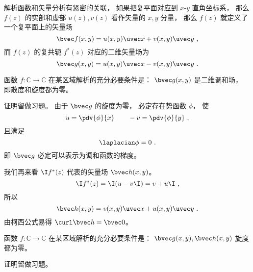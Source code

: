 

解析函数和矢量分析有紧密的关联， 如果把复平面对应到 $x$-$y$ 直角坐标系， 那么 $f(z)$ 的实部和虚部 $u(z), v(z)$ 看作矢量的 $x,y$ 分量， 那么 $f(z)$ 就定义了一个复平面上的矢量场
\begin{equation}
\bvec f(x,y) = u(x,y)\uvec x + v(x,y)\uvec y~,
\end{equation}
而 $f(z)$ 的复共轭 $f^*(z)$ 对应的二维矢量场为
\begin{equation}
\bvec g(x,y) = u(x,y)\uvec x - v(x,y)\uvec y~.
\end{equation}

\begin{theorem}{}
函数 $f:\mathbb C\to\mathbb C$ 在某区域解析的充分必要条件是： $\bvec g(x,y)$ 是二维调和场， 即散度和旋度都为零。
\end{theorem}
证明留做习题。 由于 $\bvec g$ 的旋度为零， 必定存在势函数 $\phi$， 使
\begin{equation}
u = \pdv{\phi}{x} \qquad -v = \pdv{\phi}{y}~,
\end{equation}
且满足
\begin{equation}
\laplacian \phi = 0~.
\end{equation}
即 $\bvec g$ 必定可以表示为调和函数的梯度。

我们再来看 $\I f^*(z)$ 代表的矢量场 $\bvec h(x,y)$。
\begin{equation}
\I f^*(z) = \I (u - v\I) = v + u\I~,
\end{equation}
所以
\begin{equation}
\bvec h(x,y) = v(x,y)\uvec x + u(x,y)\uvec y~.
\end{equation}
由柯西公式易得 $\curl \bvec h = \bvec 0$。

\begin{theorem}{}
函数 $f:\mathbb C\to\mathbb C$ 在某区域解析的充分必要条件是： $\bvec g(x,y), \bvec h(x,y)$ 旋度都为零。
\end{theorem}
证明留做习题。
